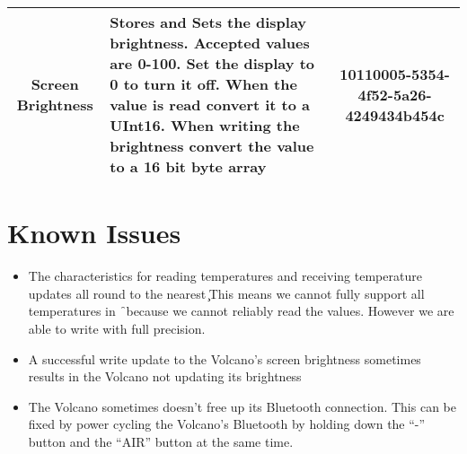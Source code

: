 \begin{longtable}{c|p{2.1in}|c}
Screen Brightness&Stores and Sets the display brightness.
Accepted values are 0-100.  
Set the display to 0 to turn it off. 
When the value is read convert it to a UInt16. 
When writing the brightness convert the value to a 16 bit byte array&
10110005-5354-4f52-5a26-4249434b454c\\ \hline
\end{longtable}
\section{Known Issues}
\begin{itemize}
    \item The characteristics for reading temperatures and receiving temperature updates all round to the nearest \c
        \subitem This means we cannot fully support all temperatures in \f\ because we cannot reliably read
        the values.  However we are able to write with full precision. 
    \item A successful write update to the Volcano's screen brightness sometimes results in the Volcano not updating its brightness
    \item The Volcano sometimes doesn't free up its Bluetooth connection. This can be fixed by power cycling the Volcano's Bluetooth by holding down the ``-'' button and the ``AIR'' button at the same time.
\end{itemize}


